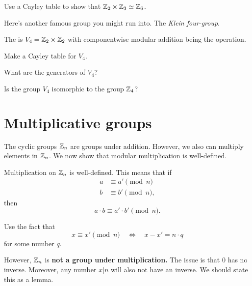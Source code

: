\documentclass{ximera}
\begin{document}
\begin{exercise}
  Use a Cayley table to show that $\mathbb Z_2\times\mathbb Z_3 \simeq \mathbb Z_6$.
\end{exercise}



Here's another famous group you might run into. The \textit{Klein
  four-group}.

\begin{definition}
  The  is $V_4 = \mathbb Z_2\times\mathbb Z_2$ with
  componentwise modular addition being the operation.
\end{definition}

\begin{exercise}
  Make a Cayley table for $V_4$.
\end{exercise}

\begin{exercise}
  What are the generators of $V_4$?
\end{exercise}

\begin{exercise}
  Is the group $V_4$ isomorphic to the group $\mathbb Z_4$?
\end{exercise}



\section{Multiplicative groups}


The cyclic groups $\mathbb Z_n$ are groups under addition. However, we also
can multiply elements in $\mathbb Z_n$. We now show that modular
multiplication is well-defined.

\begin{lemma}\label{L:mmwd}
  Multiplication on $\mathbb Z_n$ is well-defined. This means that if
  \begin{align*}
    a &\equiv a' \pmod{n}\\
    b &\equiv b' \pmod{n},
  \end{align*}
  then
  \[
  a\cdot b \equiv a'\cdot b' \pmod{n}.
  \]
  \begin{sketch}
    Use the fact that
    \[
    x \equiv x'\pmod{n} \quad \Leftrightarrow \quad x -x' = n\cdot q
    \]
    for some number $q$.
  \end{sketch}
\end{lemma}

However, $\mathbb Z_n$ is \textbf{not a group under multiplication.} The
issue is that $0$ has no inverse. Moreover, any number $x|n$ will also
not have an inverse. We should state this as a lemma.
\end{document}
